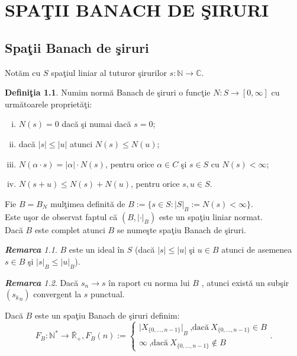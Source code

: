 \documentclass[ a4paper, 12pt]{report}
\theoremstyle{definition}
\newtheorem{definition}{\bf Defini\c tia}[section]
\theoremstyle{remark}
\newtheorem{remarc}{\bf Remarca}[section]
\numberwithin{equation}{section}
\begin{document}
\chapter{SPA\c TII BANACH DE \c SIRURI}
\section{Spa\c tii Banach de \c siruri}

Not\u am cu $S$ spa\c tiul liniar al tuturor \c sirurilor $s:\mathbb{N} \rightarrow \mathbb{C}$.
\begin{definition}
Numim norm\u a Banach de \c siruri o func\c tie $N:S \rightarrow [0,\infty]$ cu urm\u atoarele propriet\u a\c ti:
\begin{enumerate}[(i)]
\item $N(s)=0$ dac\u a \c si numai dac\u a $s=0$;
\item dac\u a $\lvert s \rvert \leq \lvert u \rvert$ atunci $N(s) \leq N(u)$;
\item $N(\alpha \cdot s)=\lvert \alpha \rvert \cdot N(s)$, pentru orice $\alpha \in C$ \c si $s \in S$ cu $N(s)<\infty$;
\item $N(s+u) \leq N(s)+N(u)$, pentru orice  $s,u \in S$.
\end{enumerate}
\end{definition}
Fie $B=B_N$ mul\c timea definit\u a de $B:=\{s \in S:{\lvert S \rvert}_B:=N(s)<\infty\}$. \\
Este u\c sor de observat faptul c\u a $(B,{\lvert \cdot \rvert}_B)$ este un spa\c tiu liniar normat.\\
Dac\u a $B$ este complet atunci $B$ se nume\c ste spa\c tiu Banach de \c siruri.
\begin{remarc}
$B$ este un ideal \^in $S$ (dac\u a $\lvert s \rvert \leq \lvert u \rvert$ \c si $u \in B$ atunci de asemenea $s \in B$ \c si ${\lvert s \rvert}_B \leq {\lvert u \rvert}_B$).
\end{remarc}
\begin{remarc}
Dac\u a $s_n \longrightarrow s$ \^in raport cu norma lui $B$ , atunci exist\u a un sub\c sir $({s_k}_n)$ convergent la $s$ punctual.
\end{remarc}
Dac\u a $B$ este un spa\c tiu Banach de \c siruri definim:\[F_B:\mathbb{N}^* \rightarrow \bar{\mathbb{R}}_+,
F_B(n):=
\begin{cases}
{\lvert X_{\{0,...,n-1\}} \rvert}_B\ \mbox{,dac\u a}\  X_{\{0,...,n-1\}} \in B \\
\infty\ \mbox{,dac\u a}\  X_{\{0,...,n-1\}} \notin B
\end{cases}.\]
\end{document}
